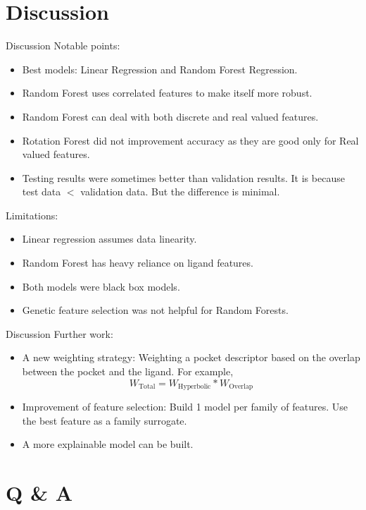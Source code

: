 \documentclass{beamer}
\begin{document}
\section{Discussion}
\begin{frame}[t]{Discussion}
Notable points:
\begin{itemize}
\item Best models: Linear Regression and Random Forest Regression.
\item Random Forest uses correlated features to make itself more robust.
\item Random Forest can deal with both discrete and real valued features.
\item Rotation Forest did not improvement accuracy as they are good only for Real valued features.
\item Testing results were sometimes better than validation results. It is because test data $<$ validation data.
But the difference is minimal.
\end{itemize} 
Limitations:
\begin{itemize}
\item Linear regression assumes data linearity.
\item Random Forest has heavy reliance on ligand features.
\item Both models were black box models.
\item Genetic feature selection was not helpful for Random Forests.

\end{itemize} 
\end{frame}

\begin{frame}[t]{Discussion}
Further work:
\begin{itemize}
\item A new weighting strategy: Weighting a pocket descriptor based on the overlap between the pocket and the ligand.  For example,
$$
W_\mathrm{Total} = W_\mathrm{Hyperbolic} * W_\mathrm{Overlap}
$$
\item Improvement of feature selection: Build 1 model per family of features. Use the best feature as a family surrogate.
\item A more explainable model can be built.
\end{itemize} 

\end{frame}

\section{Q \& A}
\end{document}
